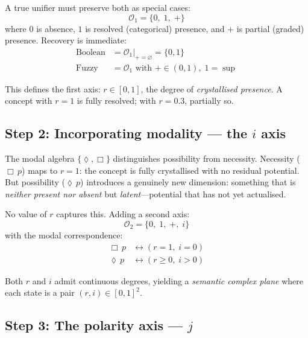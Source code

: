 \documentclass[11pt,a4paper]{article}
\newcommand{\Op}{\mathcal{O}}
\newcommand{\rey}[1]{{\color{rcolor}#1}}
\newcommand{\imag}[1]{{\color{icolor}#1}}
\newcommand{\exac}[1]{{\color{jcolor}#1}}
\def\rey#1{#1}%
\def\imag#1{#1}%
\def\exac#1{#1}%
\begin{document}
A true unifier must preserve both as special cases:
\begin{equation}
\Op_1 = \{0,\; \rey{1},\; \rey{+}\}
\end{equation}
where $0$ is absence, $\rey{1}$ is resolved (categorical) presence, and
$\rey{+}$ is partial (graded) presence. Recovery is immediate:
\begin{align}
\text{Boolean} &= \Op_1\big|_{\rey{+}=\varnothing} = \{0, \rey{1}\} \\
\text{Fuzzy}   &= \Op_1 \text{ with } \rey{+} \in (0,1),\; \rey{1} = \sup
\end{align}

This defines the first axis: $\rey{r} \in [0,1]$, the degree of
\emph{crystallised presence}. A concept with $\rey{r}=1$ is fully
resolved; with $\rey{r}=0.3$, partially so.

\subsection{Step 2: Incorporating modality --- the \texorpdfstring{$\imag{i}$}{i} axis}

The modal algebra $\{\lozenge, \Box\}$ distinguishes possibility from
necessity. Necessity ($\Box\,p$) maps to $\rey{r}=1$: the concept is
fully crystallised with no residual potential. But possibility
($\lozenge\,p$) introduces a genuinely new dimension: something that is
\emph{neither present nor absent} but \emph{latent}---potential that has
not yet actualised.

No value of $\rey{r}$ captures this. Adding a second axis:
\begin{equation}
\Op_2 = \{0,\; \rey{1},\; \rey{+},\; \imag{i}\}
\end{equation}
with the modal correspondence:
\begin{align}
\Box\,p   &\longleftrightarrow (\rey{r}=1,\; \imag{i}=0) \\
\lozenge\,p &\longleftrightarrow (\rey{r} \geq 0,\; \imag{i} > 0)
\end{align}

Both $\rey{r}$ and $\imag{i}$ admit continuous degrees, yielding a
\emph{semantic complex plane} where each state is a pair
$(\rey{r}, \imag{i}) \in [0,1]^2$.

\subsection{Step 3: The polarity axis --- \texorpdfstring{$\exac{j}$}{j}}
\end{document}
